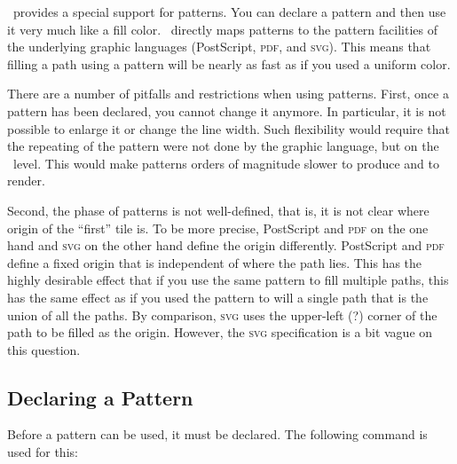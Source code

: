 \pgfname\ provides a special support for patterns. You can declare a
pattern and then use it very much like a fill color. \pgfname\
directly maps patterns to the pattern facilities of the underlying
graphic languages (PostScript, \textsc{pdf}, and \textsc{svg}). This
means that filling a path using a pattern will be nearly as fast as if
you used a uniform color.

There are a number of pitfalls and restrictions when using
patterns. First, once a pattern has been declared, you cannot change
it anymore. In particular, it is not possible to enlarge it or change
the line width. Such flexibility would require that the repeating of
the pattern were not done by the graphic language, but on the
\pgfname\ level. This would make patterns orders of magnitude slower
to produce and to render.

Second, the phase of patterns is not well-defined, that is, it is not
clear where origin of the ``first'' tile is. To be more precise,
PostScript and \textsc{pdf} on the one hand and \textsc{svg} on the
other hand define the origin differently. PostScript and \textsc{pdf}
define a fixed origin that is independent of where the path lies. This
has the highly desirable effect that if you use the same pattern to
fill multiple paths, this has the same effect as if you used the
pattern to will a single path that is the union of all the paths. By
comparison, \textsc{svg} uses the upper-left (?) corner of the path to
be filled as the origin. However, the \textsc{svg} specification is a
bit vague on this question.


\subsection{Declaring a Pattern}

Before a pattern can be used, it must be declared. The following
command is used for this:

